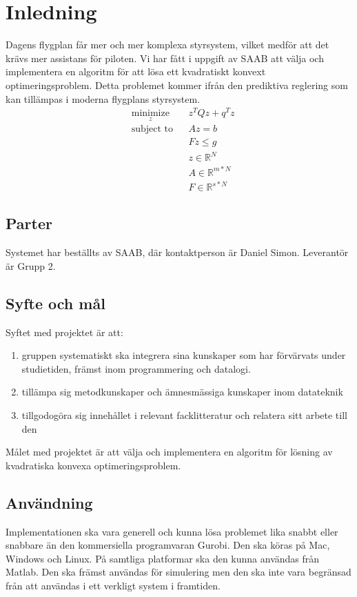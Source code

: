 \section{Inledning}
Dagens flygplan får mer och mer komplexa styrsystem, vilket medför att det krävs mer assistans för piloten. Vi har fått i uppgift av SAAB att välja och implementera en algoritm för att lösa ett kvadratiskt konvext optimeringsproblem. Detta problemet kommer ifrån den prediktiva reglering som kan tillämpas i moderna flygplans styrsystem.
\begin{equation*}
\begin{aligned}
& \underset{z}{\text{minimize}}
& & z^{T}Qz+q^{T}z \\
& \text{subject to}
& & Az=b \\
& & & Fz \leq g \\
& && z \in \mathbb{R}^N \\
& && A \in \mathbb{R}^{m*N}\\
& && F \in \mathbb{R}^{s*N}
\end{aligned}
\end{equation*}
\subsection{Parter}
Systemet har beställts av SAAB, där kontaktperson är Daniel Simon. Leverantör är Grupp 2.

\subsection{Syfte och mål}
Syftet med projektet är att:
\begin{enumerate}
 \item gruppen systematiskt ska integrera sina kunskaper som har förvärvats under studietiden, främst inom programmering och datalogi. 
 \item tillämpa sig  metodkunskaper och ämnesmässiga kunskaper inom datateknik
 \item tillgodogöra sig innehållet i relevant facklitteratur och relatera sitt arbete till den
\end{enumerate}

Målet med projektet är att välja och implementera en algoritm för lösning av kvadratiska konvexa optimeringsproblem.

\subsection{Användning}
Implementationen ska vara generell och kunna lösa problemet lika snabbt eller snabbare än den kommersiella programvaran Gurobi. Den ska köras på Mac, Windows och Linux. På samtliga platformar ska den kunna användas från Matlab. Den ska främst användas för simulering men den ska inte vara begränsad från att användas i ett verkligt system i framtiden. 

